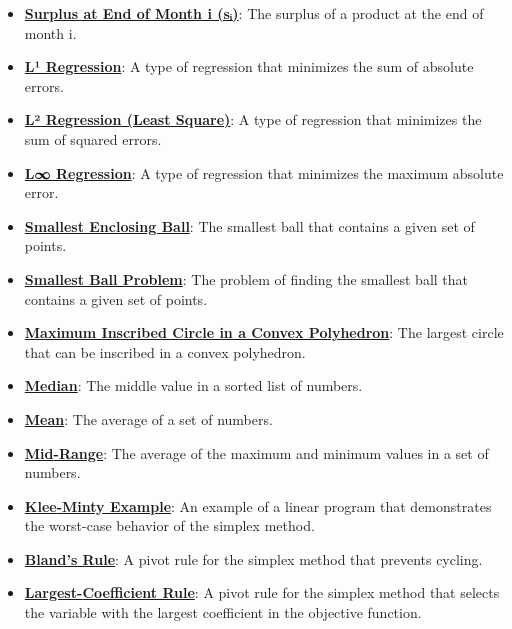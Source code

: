 \documentclass{article}%
\begin{document}
\begin{itemize}[leftmargin=*]
\item \href{https://www.math.purdue.edu/~yipn/421/2024-12-03-Duality.pdf#page=1}{\textbf{Surplus at End of Month i (sᵢ)}}: The surplus of a product at the end of month i. %
\item \href{https://www.math.purdue.edu/~yipn/421/2024-12-03-Duality.pdf#page=1}{\textbf{L¹ Regression}}: A type of regression that minimizes the sum of absolute errors. %
\item \href{https://www.math.purdue.edu/~yipn/421/2024-12-03-Duality.pdf#page=1}{\textbf{L² Regression (Least Square)}}: A type of regression that minimizes the sum of squared errors. %
\item \href{https://www.math.purdue.edu/~yipn/421/2024-12-03-Duality.pdf#page=1}{\textbf{L∞ Regression}}: A type of regression that minimizes the maximum absolute error. %
\item \href{https://www.math.purdue.edu/~yipn/421/2024-12-03-Duality.pdf#page=1}{\textbf{Smallest Enclosing Ball}}: The smallest ball that contains a given set of points. %
\item \href{https://www.math.purdue.edu/~yipn/421/2024-12-03-Duality.pdf#page=1}{\textbf{Smallest Ball Problem}}: The problem of finding the smallest ball that contains a given set of points. %
\item \href{https://www.math.purdue.edu/~yipn/421/2024-12-03-Duality.pdf#page=1}{\textbf{Maximum Inscribed Circle in a Convex Polyhedron}}: The largest circle that can be inscribed in a convex polyhedron. %
\item \href{https://www.math.purdue.edu/~yipn/421/2024-12-03-Duality.pdf#page=1}{\textbf{Median}}: The middle value in a sorted list of numbers. %
\item \href{https://www.math.purdue.edu/~yipn/421/2024-12-03-Duality.pdf#page=1}{\textbf{Mean}}: The average of a set of numbers. %
\item \href{https://www.math.purdue.edu/~yipn/421/2024-12-03-Duality.pdf#page=1}{\textbf{Mid{-}Range}}: The average of the maximum and minimum values in a set of numbers. %
\item \href{https://www.math.purdue.edu/~yipn/421/2024-12-03-Duality.pdf#page=1}{\textbf{Klee{-}Minty Example}}: An example of a linear program that demonstrates the worst-case behavior of the simplex method. %
\item \href{https://www.math.purdue.edu/~yipn/421/2024-12-03-Duality.pdf#page=1}{\textbf{Bland's Rule}}: A pivot rule for the simplex method that prevents cycling. %
\item \href{https://www.math.purdue.edu/~yipn/421/2024-12-03-Duality.pdf#page=1}{\textbf{Largest{-}Coefficient Rule}}: A pivot rule for the simplex method that selects the variable with the largest coefficient in the objective function. %

\end{itemize}
\end{document}
